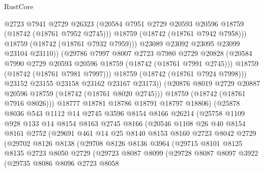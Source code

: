 \begin{lexlean}{RustCore}
\begin{coremodule}
                        @2723
                        @7941
                        @2729
                        @26323
                        (@20584 @7951 @2729 @20593 @20596 @18759 (@18742 (@18761 @7952 @2745)))
                        @18759
                        (@18742 (@18761 @7942 @7958)))
                      @18759
                      (@18742 (@18761 @7932 @7959)))
                    @23089
                    @23092
                    @23095
                    @23099
                    @23104
                    @23110))
                (@29786
                  @7997
                  @8007
                  @2723
                  @7980
                  @2729
                  @20828
                  (@20584 @7990 @2729 @20593 @20596 @18759 (@18742 (@18761 @7991 @2745)))
                  @18759
                  (@18742 (@18761 @7981 @7997)))
                @18759
                (@18742 (@18761 @7924 @7998)))
              @23152
              @23155
              @23158
              @23162
              @23167
              @23173))
          (@20876 @8019 @2729 @20887 @20596 @18759 (@18742 (@18761 @8020 @2745)))
          @18759
          (@18742 (@18761 @7916 @8026)))
        @18777
        @18781
        @18786
        @18791
        @18797
        @18806)
      (@25878
        @8036
        @543
        @1112
        @14
        @2745
        @3596
        @8154
        @8166
        @26214
        (@25758
          @1109
          @928
          @133
          @14
          @8154
          @8163
          @2745
          @8166
          (@20546
            @1108
            @26
            @40
            @8154
            @8161
            @2752
            (@29691
              @461
              @14
              @25
              @8140
              @8153
              @8160
              @2723
              @8042
              @2729
              (@29702
                @8126
                @8138
                (@29708
                  @8126
                  @8136
                  @3964
                  (@29715
                    @8101
                    @8125
                    @8135
                    @2723
                    @8050
                    @2729
                    (@29723
                      @8087
                      @8099
                      (@29728
                        @8087
                        @8097
                        @3922
                        (@29735
                          @8086
                          @8096
                          @2723
                          @8058

\end{coremodule}
\end{lexlean}
